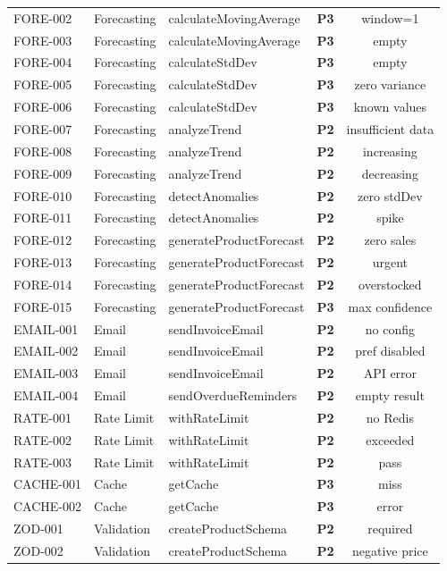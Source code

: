 \documentclass[12pt,a4paper]{report}
\newcommand{\ptwo}{\textbf{\color{p2orange}P2}}
\newcommand{\pthree}{\textbf{\color{p3blue}P3}}
\begin{document}
\begin{center}
\begin{longtable}{llllc}
  FORE-002 & Forecasting & calculateMovingAverage & \pthree & window=1 \\
  FORE-003 & Forecasting & calculateMovingAverage & \pthree & empty \\
  FORE-004 & Forecasting & calculateStdDev & \pthree & empty \\
  FORE-005 & Forecasting & calculateStdDev & \pthree & zero variance \\
  FORE-006 & Forecasting & calculateStdDev & \pthree & known values \\
  FORE-007 & Forecasting & analyzeTrend & \ptwo & insufficient data \\
  FORE-008 & Forecasting & analyzeTrend & \ptwo & increasing \\
  FORE-009 & Forecasting & analyzeTrend & \ptwo & decreasing \\
  FORE-010 & Forecasting & detectAnomalies & \ptwo & zero stdDev \\
  FORE-011 & Forecasting & detectAnomalies & \ptwo & spike \\
  FORE-012 & Forecasting & generateProductForecast & \ptwo & zero sales \\
  FORE-013 & Forecasting & generateProductForecast & \ptwo & urgent \\
  FORE-014 & Forecasting & generateProductForecast & \ptwo & overstocked \\
  FORE-015 & Forecasting & generateProductForecast & \pthree & max confidence \\
  EMAIL-001 & Email & sendInvoiceEmail & \ptwo & no config \\
  EMAIL-002 & Email & sendInvoiceEmail & \ptwo & pref disabled \\
  EMAIL-003 & Email & sendInvoiceEmail & \ptwo & API error \\
  EMAIL-004 & Email & sendOverdueReminders & \ptwo & empty result \\
  RATE-001 & Rate Limit & withRateLimit & \ptwo & no Redis \\
  RATE-002 & Rate Limit & withRateLimit & \ptwo & exceeded \\
  RATE-003 & Rate Limit & withRateLimit & \ptwo & pass \\
  CACHE-001 & Cache & getCache & \pthree & miss \\
  CACHE-002 & Cache & getCache & \pthree & error \\
  ZOD-001  & Validation & createProductSchema & \ptwo & required \\
  ZOD-002  & Validation & createProductSchema & \ptwo & negative price \\

\end{longtable}
\end{center}
\end{document}
